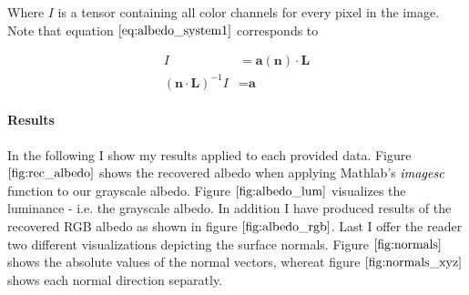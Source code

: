 \documentclass{paper}
\begin{document}
Where $I$ is a tensor containing all color channels for every pixel in the image.
Note that equation $\ref{eq:albedo_system1}$ corresponds to 

\begin{align}
    I &= \textbf{a}(\textbf{n}) \cdot \textbf{L} \nonumber \\
    (\textbf{n} \cdot \textbf{L})^{-1}I &= \textbf{a}
\label{eq:albedo_system2}
\end{align}

\paragraph{Results}

In the following I show my results applied to each provided data. Figure $\ref{fig:rec_albedo}$ shows the recovered albedo when applying Mathlab's $\emph{imagesc}$ function to our grayscale albedo. Figure $\ref{fig:albedo_lum}$ visualizes the luminance - i.e. the grayscale albedo. In addition I have produced results of the recovered RGB albedo as shown in figure $\ref{fig:albedo_rgb}$. Last I offer the reader two different visualizations depicting the surface normals. Figure $\ref{fig:normals}$ shows the absolute values of the normal vectors, whereat figure $\ref{fig:normals_xyz}$ shows each normal direction separatly.
\end{document}
